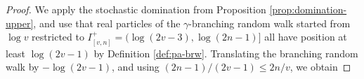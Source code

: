 \documentclass[a4paper, a4wide, 10pt, reqno]{amsart}
\theoremstyle{plain}
\theoremstyle{definition}
\numberwithin{equation}{section}
\newcommand{\E}{\mathbb E}
\newcommand{\Prob}{\mathbb{P}}
\newcommand{\sC}{{\mathscr C}}
\newcommand{\sT}{{\mathscr T}}
\newcommand{\Si}{{\mathrm{Si}}}
\newcommand{\ind}[1]{\mathbbm{1}_{\{#1\}}}
\begin{document}
\begin{proof}

We apply the stochastic domination from Proposition \ref{prop:domination-upper}, and use that
    real particles of the $\gamma$-branching random walk started from $\log v$ restricted to $I^+_{[v,n]}=(\log(2v-3), \log (2n-1)]$ all have position at least $\log (2v-1)$ by Definition \ref{def:pa-brw}. Translating the branching random walk by $-\log (2v-1)$, and using $(2n-1)/(2v-1)\le 2n/v$, we obtain  

\end{proof}
\end{document}
